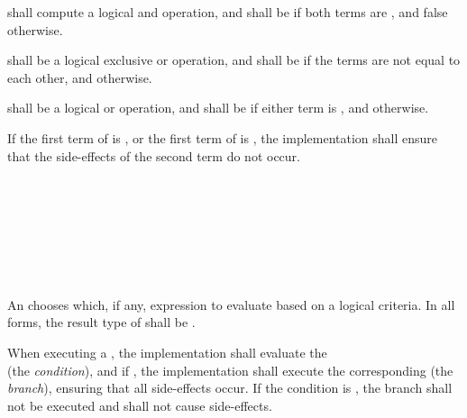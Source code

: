 \specsubsubitem
\terminal{\&\&} shall compute a logical and operation, and shall be
 if both terms are , and false otherwise.

\specsubsubitem
\terminal{\textasciicircum\textasciicircum} shall be a logical exclusive or
operation, and shall be  if the terms are not equal to each
other, and  otherwise.

\specsubsubitem
\terminal{||} shall be a logical or operation, and shall be  if
either term is , and  otherwise.

\specsubsubitem
If the first term of  is ,
or the first term of  is ,
the implementation shall ensure that the side-effects of the second term do not
occur.


\begin{grammar}
 \\
	  \\
	    \\
	    \\

 \\
	\terminal{(}  \terminal{)}  \\
\end{grammar}

\specsubsubitem
An  chooses which, if any, expression to evaluate
based on a logical criteria. In all forms, the result type of
 shall be .

\specsubsubitem
When executing a , the implementation shall
evaluate the \\  (the \textit{condition}), and
if , the implementation shall execute the corresponding
 (the \textit{branch}), ensuring that all
side-effects occur. If the condition is , the branch shall not
be executed and shall not cause side-effects.

